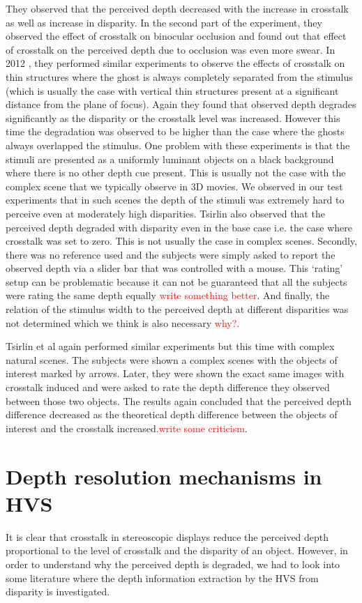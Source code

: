 They observed that the perceived depth decreased with the increase in crosstalk as well as increase in disparity. In the second part of the experiment, they observed the effect of crosstalk on binocular occlusion and found out that effect of crosstalk on the perceived depth due to occlusion was even more swear. In 2012 \cite{tsirlin2012effect}, they performed similar experiments to observe the effects of crosstalk on thin structures where the ghost is always completely separated from the stimulus (which is usually the case with vertical thin structures present at a significant distance from the plane of focus). Again they found that observed depth degrades significantly as the disparity or the crosstalk level was increased. However this time the degradation was observed to be higher than the case where the ghosts always overlapped the stimulus. One problem with these experiments is that the stimuli are presented as a uniformly luminant objects on a black background where there is no other depth cue present. This is usually not the case with the complex scene that we typically observe in 3D movies. We observed in our test experiments that in such scenes the depth of the stimuli was extremely hard to perceive even at moderately high disparities. Tsirlin also observed that the perceived depth degraded with disparity even in the base case i.e. the case where crosstalk was set to zero. This is not usually the case in complex scenes. Secondly, there was no reference used and the subjects were simply asked to report the observed depth via a slider bar that was controlled with a mouse. This `rating' setup can be problematic because it can not be guaranteed that all the subjects were rating the same depth equally \textcolor{red}{write something better}. And finally, the relation of the stimulus width to the perceived depth at different disparities was not determined which we think is also necessary \textcolor{red}{why?}.

Tsirlin et al \cite{tsirlin2012crosstalk} again performed similar experiments but this time with complex natural scenes. The subjects were shown a complex scenes with the objects of interest marked by arrows. Later, they were shown the exact same images with crosstalk induced and were asked to rate the depth difference they observed between those two objects. The results again concluded that the perceived depth difference decreased as the theoretical depth difference between the objects of interest and the crosstalk increased.\textcolor{red}{write some criticism}.

\section{Depth resolution mechanisms in HVS}
It is clear that crosstalk in stereoscopic displays reduce the perceived depth proportional to the level of crosstalk and the disparity of an object. However, in order to understand why the perceived depth is degraded, we had to look into some literature where the depth information extraction by the HVS from disparity is investigated.

